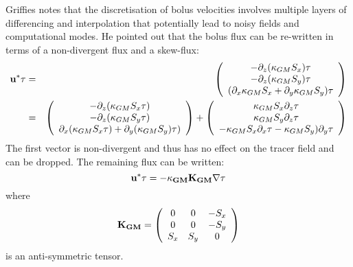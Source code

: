 Griffies notes that the discretisation of bolus velocities involves
multiple layers of differencing and interpolation that potentially
lead to noisy fields and computational modes. He pointed out that the
bolus flux can be re-written in terms of a non-divergent flux and a
skew-flux:
\begin{eqnarray*}
\bf{u}^* \tau
& = &
\left( \begin{array}{c}
- \partial_z ( \kappa_{GM} S_x ) \tau \\
- \partial_z ( \kappa_{GM} S_y ) \tau \\
(\partial_x \kappa_{GM} S_x + \partial_y \kappa_{GM} S_y)\tau
\end{array} \right)
\\
& = &
\left( \begin{array}{c}
- \partial_z ( \kappa_{GM} S_x \tau) \\
- \partial_z ( \kappa_{GM} S_y \tau) \\
\partial_x ( \kappa_{GM} S_x \tau) + \partial_y ( \kappa_{GM} S_y) \tau)
\end{array} \right)
+ \left( \begin{array}{c}
 \kappa_{GM} S_x \partial_z \tau \\
 \kappa_{GM} S_y \partial_z \tau \\
- \kappa_{GM} S_x \partial_x \tau - \kappa_{GM} S_y) \partial_y \tau
\end{array} \right)
\end{eqnarray*}
The first vector is non-divergent and thus has no effect on the tracer
field and can be dropped. The remaining flux can be written:
\begin{equation}
\bf{u}^* \tau = - \kappa_{GM} \bf{K}_{GM} \bf{\nabla} \tau
\end{equation}
where
\begin{equation}
\bf{K}_{GM} =
\left(
\begin{array}{ccc}
0 & 0 & -S_x \\
0 & 0 & -S_y \\
S_x & S_y & 0
\end{array}
\right)
\end{equation}
is an anti-symmetric tensor.

